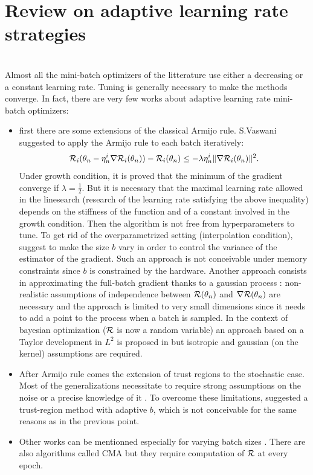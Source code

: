 \section{Review on adaptive learning rate strategies}
\label{adapt}
~~\\
Almost all the mini-batch optimizers of the litterature use either a decreasing or a constant learning rate. 
Tuning is generally necessary to make the methods converge. In fact, there are very few works about adaptive learning rate mini-batch optimizers:
\begin{itemize}
	\item first there are some extensions of the classical Armijo rule. S.Vaswani \cite{stochastic_armijo} suggested to apply the Armijo rule to each batch iteratively:
	\begin{equation*}
		\mathcal{R}_i(\theta_n-\eta_n^i \nabla \mathcal{R}_i(\theta_n))-\mathcal{R}_i(\theta_n) \leq -\lambda \eta_n^i \|\nabla \mathcal{R}_i(\theta_n)\|^2.
	\end{equation*}
	Under growth condition, it is proved that the minimum of the gradient converge if $\lambda=\frac12$. But it is necessary that the maximal learning rate allowed in the linesearch (research of the learning rate satisfying the above inequality) depends on the stiffness of the function and of a constant involved in the growth condition. Then the algorithm is not free from hyperparameters to tune. To get rid of the overparametrized setting (interpolation condition), \cite{armijo_batch_size,armijo_variance_reduction} suggest to make the size $b$ vary in order to control the variance of the estimator of the gradient. Such an approach is not conceivable under memory constraints since $b$ is constrained by the hardware. Another approach consists in approximating the full-batch gradient thanks to a gaussian process \cite{armijo_GP}: non-realistic assumptions of independence between $\mathcal{R}(\theta_n)$ and $\nabla \mathcal{R}(\theta_n)$ are necessary and the approach is limited to very small dimensions since it needs to add a point to the process when a batch is sampled. In the context of bayesian optimization ($\mathcal{R}$ is now a random variable) an approach based on a Taylor development in $L^2$ is proposed in \cite{armijo_L2} but isotropic and gaussian (on the kernel) assumptions are required. 
	\item After Armijo rule comes the extension of trust regions to the stochastic case. Most of the generalizations necessitate to require strong assumptions on the noise
          \cite{sto_TR_bounded} or a precise knowledge of it \cite{sto_TR_affine_noise,sto_TR_representative}. To overcome these limitations, \cite{sto_TR_sampling} suggested a
          trust-region method with adaptive $b$, which is not conceivable for the same reasons as in the previous point. %
	\item Other works can be mentionned especially for varying batch sizes \cite{adaptive_sampling,adaptive_batch,sgd_lauched}. There are also algorithms called CMA \cite{CMA,CMA_Light} but they require computation of $\mathcal{R}$ at every epoch.
\end{itemize}
